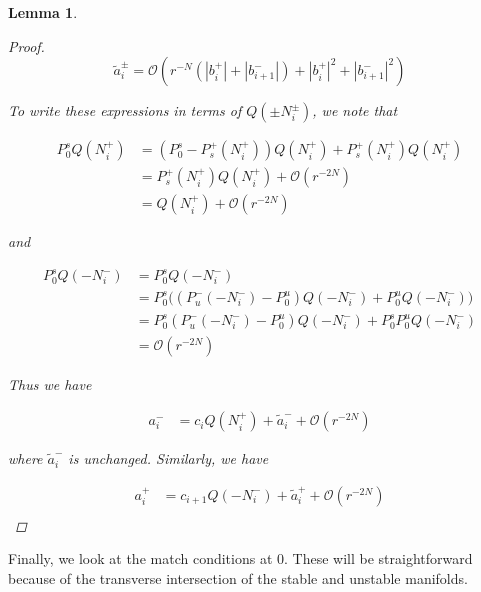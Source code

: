 \documentclass[12pt]{article}
\newtheorem{lemma}{Lemma}
\begin{document}
\begin{lemma}
\begin{proof}
\[
\tilde{a}_i^\pm = \mathcal{O}(r^{-N}(|b_i^+|+|b_{i+1}^-|) + |b_i^+|^2+|b_{i+1}^-|^2) 
\]

To write these expressions in terms of $Q(\pm N_i^\pm)$, we note that

\begin{align*}
P_0^s Q(N_i^+) &= (P_0^s - P_s^+(N_i^+)) Q(N_i^+) + P_s^+(N_i^+) Q(N_i^+) \\
&= P_s^+(N_i^+) Q(N_i^+) + \mathcal{O}(r^{-2N}) \\
&= Q(N_i^+) + \mathcal{O}(r^{-2N}) 
\end{align*}

and 

\begin{align*}
P_0^s Q(-N_i^-) &= P_0^s  Q(-N_i^-) \\
&= P_0^s \Big( ( P_u^-(-N_i^-) - P_0^u) Q(-N_i^-) + P_0^u Q(-N_i^-) \Big) \\
&= P_0^s ( P_u^-(-N_i^-) - P_0^u) Q(-N_i^-) + P_0^s P_0^u Q(-N_i^-) \\
&= \mathcal{O}(r^{-2N})
\end{align*}

Thus we have

\begin{align*}
a_i^- &= c_i Q(N_i^+) + \tilde{a}_i^- + \mathcal{O}(r^{-2N})
\end{align*}

where $\tilde{a}_i^-$ is unchanged. Similarly, we have

\begin{align*}
a_i^+ &= c_{i+1} Q(-N_i^-) + \tilde{a}_i^+ + \mathcal{O}(r^{-2N}) \\
\end{align*}

\end{proof}
\end{lemma}

Finally, we look at the match conditions at 0. These will be straightforward because of the transverse intersection of the stable and unstable manifolds.

\end{document}
